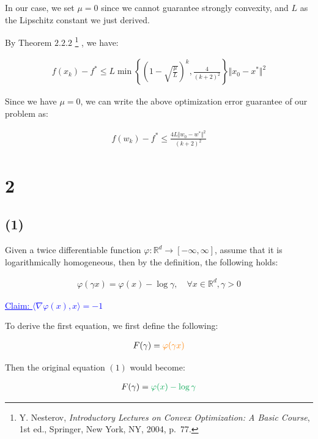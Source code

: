 \documentclass{article}
\begin{document}
In our case, we set $\mu = 0$ since we cannot guarantee strongly convexity, and $L$ as the Lipschitz constant we just derived.
\bigskip

By Theorem $2.2.2$
\footnote{Y. Nesterov, \textit{Introductory Lectures on Convex Optimization: A Basic Course}, 1st ed., Springer, New York, NY, 2004, p.~77.}
, we have:

\begin{align*}
    f(x_k) - f^* \leq L \min \left\{ \left(1 - \sqrt{\frac{\mu}{L}}\right)^k, \frac{4}{(k+2)^2} \right\} \Vert x_0 - x^* \Vert^2
\end{align*}

Since we have $\mu = 0$, we can write the above optimization error guarantee of our problem as:

\begin{align*}
    f(w_k) - f^* \leq \frac{4L \Vert w_0 - w^* \Vert^2}{(k+2)^2} 
\end{align*}

\section*{2}

\subsection*{(1)}

Given a twice differentiable function $\varphi: \mathbb{R}^d \to [- \infty, \infty]$, 
assume that it is logarithmically homogeneous, 
then by the definition, the following holds:

\begin{align*}
    \varphi ( \gamma x ) = \varphi (x) - \log \gamma, \quad \forall x \in \mathbb{R}^d, \gamma > 0 \tag{1}
\end{align*}

\textcolor{blue}{\underline{Claim: $\langle \nabla \varphi (x), x \rangle = - 1$ } }
\bigskip

To derive the first equation, we first define the following:

\begin{align*}
    F(\gamma) = \textcolor{orange}{\varphi (\gamma x)}
\end{align*}

Then the original equation $(1)$ would become:

\begin{align*}
    F(\gamma) = \textcolor{Green}{\varphi (x) - \log \gamma}
\end{align*}
\end{document}
